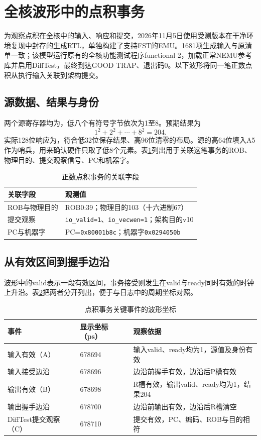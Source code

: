 \section{全核波形中的点积事务}
为观察点积在全核中的输入、响应和提交，2026年11月5日使用受测版本在干净环境复现中封存的生成RTL，单独构建了支持FST的EMU。1681项生成输入与原清单一致；该模型运行原有的全核功能测试程序functional-2，加载正常NEMU参考库并启用DiffTest，最终到达GOOD TRAP、退出码0。以下波形将同一笔正数点积从执行输入关联到架构提交。

\subsection{源数据、结果与身份}
两个源寄存器均为，低八个有符号字节依次为1至8。预期结果为
\[
1^2+2^2+\cdots+8^2=204.
\]
实际128位响应为，符合低32位保存结果、高96位清零的布局。源的高64位填入A5作为哨兵，用来确认硬件只取了低8个元素。表\ref{tab:3-wave-identity}列出用于关联这笔事务的ROB、物理目的、提交观察信号、PC和机器字。

\begin{table}[!htbp]\centering\small
\caption{正数点积事务的关联字段}\label{tab:3-wave-identity}
\begin{tabular}{p{.24\linewidth}p{.68\linewidth}}\toprule
关联字段 & 观测值\\\midrule
ROB与物理目的 & ROB0:39；物理目的103（十六进制67）\\
提交观察 & \texttt{io\_valid=1}、\texttt{io\_vecwen=1}；架构目的v10\\
PC与机器字 & PC=\texttt{0x80001b8c}；机器字\texttt{0x0294050b}\\
\bottomrule\end{tabular}
\end{table}

\subsection{从有效区间到握手边沿}
波形中的valid表示一段有效区间，事务接受则发生在valid与ready同时有效的时钟上升沿。表\ref{tab:3-wave-events}把两者分开列出，便于与日志中的周期坐标对照。

\begin{table}[!htbp]\centering\small
\caption{点积事务关键事件的波形坐标}\label{tab:3-wave-events}
\begin{tabular}{p{.25\linewidth}p{.17\linewidth}p{.48\linewidth}}\toprule
事件 & 显示坐标（ps） & 观察依据\\\midrule
输入有效（A） & 678694 & 输入valid、ready均为1，源值及身份有效\\
输入接受边沿 & 678696 & 边沿前握手有效，边沿后P槽有效\\
输出有效（B） & 678698 & R槽有效，输出valid、ready均为1，结果204\\
输出握手边沿 & 678700 & 边沿前输出有效，边沿后R槽清空\\
DiffTest提交观察（C） & 678710 & 提交有效，PC、编码、ROB与目的相符\\
\bottomrule\end{tabular}
\end{table}

